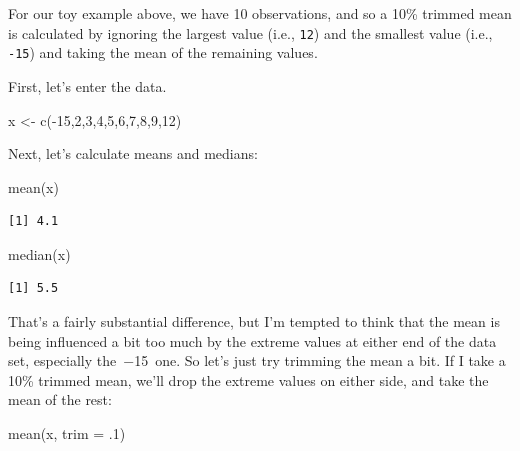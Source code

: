 \documentclass[
  letterpaper,
  DIV=11,
  numbers=noendperiod]{scrartcl}
\newenvironment{Shaded}{\begin{snugshade}}{\end{snugshade}}
\newcommand{\AttributeTok}[1]{\textcolor[rgb]{0.40,0.45,0.13}{#1}}
\newcommand{\DecValTok}[1]{\textcolor[rgb]{0.68,0.00,0.00}{#1}}
\newcommand{\FunctionTok}[1]{\textcolor[rgb]{0.28,0.35,0.67}{#1}}
\newcommand{\NormalTok}[1]{\textcolor[rgb]{0.00,0.23,0.31}{#1}}
\newcommand{\OtherTok}[1]{\textcolor[rgb]{0.00,0.23,0.31}{#1}}
\newcommand{\SpecialCharTok}[1]{\textcolor[rgb]{0.37,0.37,0.37}{#1}}
\begin{document}
For our toy example above, we have 10 observations, and so a 10\%
trimmed mean is calculated by ignoring the largest value (i.e.,
\texttt{12}) and the smallest value (i.e., \texttt{-15}) and taking the
mean of the remaining values.

First, let's enter the data.

\begin{Shaded}
\begin{Highlighting}[]
\NormalTok{x }\OtherTok{\textless{}{-}} \FunctionTok{c}\NormalTok{(}\SpecialCharTok{{-}}\DecValTok{15}\NormalTok{,}\DecValTok{2}\NormalTok{,}\DecValTok{3}\NormalTok{,}\DecValTok{4}\NormalTok{,}\DecValTok{5}\NormalTok{,}\DecValTok{6}\NormalTok{,}\DecValTok{7}\NormalTok{,}\DecValTok{8}\NormalTok{,}\DecValTok{9}\NormalTok{,}\DecValTok{12}\NormalTok{)}
\end{Highlighting}
\end{Shaded}

Next, let's calculate means and medians:

\begin{Shaded}
\begin{Highlighting}[]
\FunctionTok{mean}\NormalTok{(x)}
\end{Highlighting}
\end{Shaded}

\begin{verbatim}
[1] 4.1
\end{verbatim}

\begin{Shaded}
\begin{Highlighting}[]
\FunctionTok{median}\NormalTok{(x)}
\end{Highlighting}
\end{Shaded}

\begin{verbatim}
[1] 5.5
\end{verbatim}

That's a fairly substantial difference, but I'm tempted to think that
the mean is being influenced a bit too much by the extreme values at
either end of the data set, especially the~−15~one. So let's just try
trimming the mean a bit. If I take a 10\% trimmed mean, we'll drop the
extreme values on either side, and take the mean of the rest:

\begin{Shaded}
\begin{Highlighting}[]
\FunctionTok{mean}\NormalTok{(x, }\AttributeTok{trim =}\NormalTok{ .}\DecValTok{1}\NormalTok{)}
\end{Highlighting}
\end{Shaded}
\end{document}
